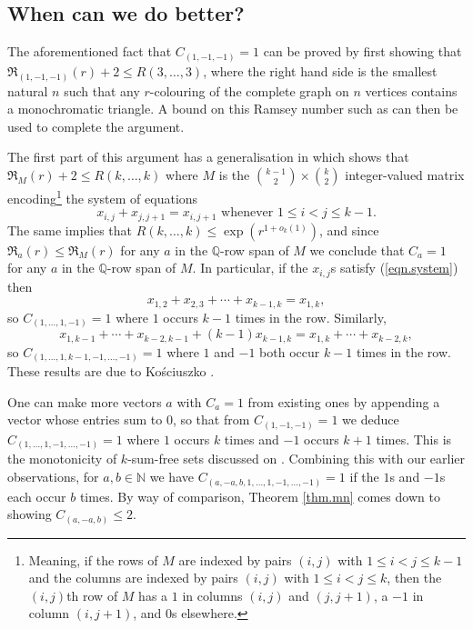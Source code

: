 \documentclass[12pt,reqno]{amsart}
\providecommand{\N}{\mathbb{N}}
\providecommand{\Q}{\mathbb{Q}}
\numberwithin{equation}{section}
\begin{document}
\subsection{When can we do better?} The aforementioned fact that $C_{(1,-1,-1)}=1$ can be proved by first showing that $\mathfrak{R}_{(1,-1,-1)}(r)+2 \leq R(3,\dots,3)$, where the right hand side is the smallest natural $n$ such that any $r$-colouring of the complete graph on $n$ vertices contains a monochromatic triangle. A bound on this Ramsey number such as \cite[Corollary 3]{gregle::0} can then be used to complete the argument.

The first part of this argument has a generalisation in \cite[(3.4), p181]{Abbott:1972aa} which shows that $\mathfrak{R}_M(r) +2 \leq R(k,\dots,k)$ where $M$ is the $\binom{k-1}{2} \times \binom{k}{2}$ integer-valued matrix encoding\footnote{Meaning, if the rows of $M$ are indexed by pairs $(i,j)$ with $1 \leq i < j \leq k-1$ and the columns are indexed by pairs $(i,j)$ with $1 \leq i < j \leq k$, then the $(i,j)$th row of $M$ has a $1$ in columns $(i,j)$ and $(j,j+1)$, a $-1$ in column $(i,j+1)$, and $0$s elsewhere.} the system of equations
\begin{equation}\label{eqn.system}
x_{i,j}+x_{j,j+1}=x_{i,j+1} \text{ whenever }1 \leq i < j \leq k-1.
\end{equation}
The same \cite[Corollary 3]{gregle::0} implies that $R(k,\dots,k)\leq \exp(r^{1+o_k(1)})$, and since $\mathfrak{R}_a(r) \leq \mathfrak{R}_M(r)$ for any $a$ in the $\Q$-row span of $M$ we conclude that $C_a=1$ for any $a$ in the $\Q$-row span of $M$. In particular, if the $x_{i,j}$s satisfy (\ref{eqn.system}) then 
\begin{equation*}
x_{1,2}+x_{2,3}+\cdots + x_{k-1,k}=x_{1,k},
\end{equation*}
 so $C_{(1,\dots,1,-1)}=1$ where $1$ occurs $k-1$ times in the row. Similarly, 
 \begin{equation*}
 x_{1,k-1}+\cdots + x_{k-2,k-1} + (k-1)x_{k-1,k} = x_{1,k}+\cdots + x_{k-2,k},
 \end{equation*}
  so $C_{(1,\dots,1,k-1,-1,\dots,-1)}=1$ where $1$ and $-1$ both occur $k-1$ times in the row. These results are due to Ko{\'s}ciuszko \cite[Theorems 6 \& 7]{Kosciuszko:2025aa}.
  
 One can make more vectors $a$ with $C_a=1$ from existing ones by appending a vector whose entries sum to $0$, so that from $C_{(1,-1,-1)}=1$ we deduce $C_{(1,\dots,1,-1,\dots,-1)}=1$ where $1$ occurs $k$ times and $-1$ occurs $k+1$ times. This is the monotonicity of $k$-sum-free sets discussed on \cite[p604]{cwasch::0}. Combining this with our earlier observations, for $a,b\in \N$ we have $C_{(a,-a,b,1,\dots,1,-1,\dots,-1)}=1$ if the $1$s and $-1$s each occur $b$ times. By way of comparison, Theorem \ref{thm.mn} comes down to showing $C_{(a,-a,b)}\leq 2$.
\end{document}
